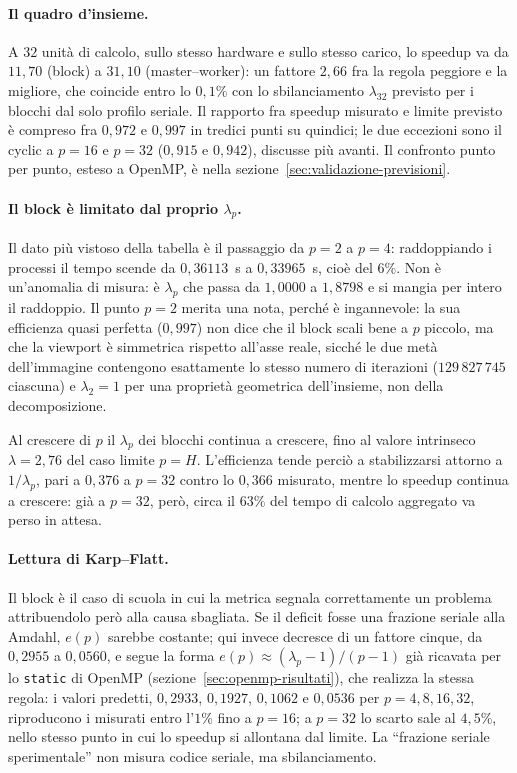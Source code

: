 \paragraph{Il quadro d'insieme.}
A $32$ unità di calcolo, sullo stesso hardware e sullo stesso carico, lo speedup
va da $11{,}70$ (block) a $31{,}10$ (master--worker): un fattore $2{,}66$ fra la
regola peggiore e la migliore, che coincide entro lo $0{,}1\%$ con lo
sbilanciamento $\lambda_{32}$ previsto per i blocchi dal solo profilo seriale.
Il rapporto fra speedup misurato e limite previsto è compreso fra $0{,}972$ e
$0{,}997$ in tredici punti su quindici; le due eccezioni sono il cyclic a $p=16$
e $p=32$ ($0{,}915$ e $0{,}942$), discusse più avanti. Il confronto punto per
punto, esteso a OpenMP, è nella sezione~\ref{sec:validazione-previsioni}.

\paragraph{Il block è limitato dal proprio $\lambda_p$.}
Il dato più vistoso della tabella è il passaggio da $p=2$ a $p=4$: raddoppiando
i processi il tempo scende da $0{,}36113$~s a $0{,}33965$~s, cioè del $6\%$.
Non è un'anomalia di misura: è $\lambda_p$ che passa da $1{,}0000$ a $1{,}8798$
e si mangia per intero il raddoppio. Il punto $p=2$ merita una nota, perché è
ingannevole: la sua efficienza quasi perfetta ($0{,}997$) non dice che il block
scali bene a $p$ piccolo, ma che la viewport è simmetrica rispetto all'asse
reale, sicché le due metà dell'immagine contengono esattamente lo stesso numero
di iterazioni ($129\,827\,745$ ciascuna) e $\lambda_2 = 1$ per una proprietà
geometrica dell'insieme, non della decomposizione.

Al crescere di $p$ il $\lambda_p$ dei blocchi continua a crescere, fino al valore
intrinseco $\lambda = 2{,}76$ del caso limite $p = H$. L'efficienza tende perciò
a stabilizzarsi attorno a $1/\lambda_p$, pari a $0{,}376$ a $p=32$ contro lo
$0{,}366$ misurato, mentre lo speedup continua a crescere: già a $p=32$, però,
circa il $63\%$ del tempo di calcolo aggregato va perso in attesa.

\paragraph{Lettura di Karp--Flatt.}
Il block è il caso di scuola in cui la metrica segnala correttamente un problema
attribuendolo però alla causa sbagliata. Se il deficit fosse una frazione
seriale alla Amdahl, $e(p)$ sarebbe costante; qui invece decresce di un fattore
cinque, da $0{,}2955$ a $0{,}0560$, e segue la forma
$e(p) \approx (\lambda_p - 1)/(p - 1)$ già ricavata per lo \texttt{static} di
OpenMP (sezione~\ref{sec:openmp-risultati}), che realizza la stessa regola: i
valori predetti, $0{,}2933$, $0{,}1927$, $0{,}1062$ e $0{,}0536$ per
$p = 4, 8, 16, 32$, riproducono i misurati entro l'$1\%$ fino a $p=16$; a
$p=32$ lo scarto sale al $4{,}5\%$, nello stesso punto in cui lo speedup si
allontana dal limite. La ``frazione seriale
sperimentale'' non misura codice seriale, ma sbilanciamento.

